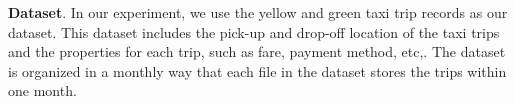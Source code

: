 {\bf Dataset}. 
In our experiment, we use the yellow and green taxi trip records as our dataset. 
This dataset includes the pick-up and drop-off location of the taxi trips and the properties for each trip, such as fare, payment method, etc,. The dataset is organized in a monthly way that each file in the dataset stores the trips within one month.



